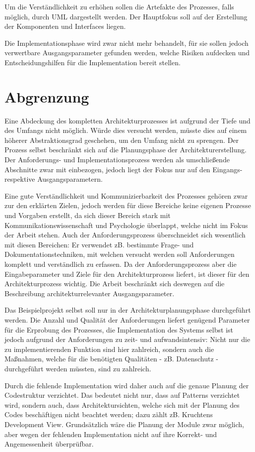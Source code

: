 Um die Verständlichkeit zu erhöhen sollen die Artefakte des Prozesses, falls möglich, durch UML dargestellt werden. Der Hauptfokus soll auf der Erstellung der Komponenten und Interfaces liegen.

Die Implementationsphase wird zwar nicht mehr behandelt, für sie sollen jedoch verwertbare Ausgangsparameter gefunden werden, welche Risiken aufdecken und Entscheidungshilfen für die Implementation bereit stellen.


\section{Abgrenzung}
Eine Abdeckung des kompletten Architekturprozesses ist aufgrund der Tiefe und des Umfangs nicht möglich. Würde dies versucht werden, müsste dies auf einem  höherer Abstraktionsgrad geschehen, um den Umfang nicht zu sprengen. Der Prozess selbst beschränkt sich auf die Planungsphase der Architekturerstellung. Der Anforderungs- und Implementationsprozess werden als umschließende Abschnitte zwar mit einbezogen, jedoch liegt der Fokus nur auf den Eingangs- respektive Ausgangsparametern.

Eine gute Verständlichkeit und Kommunizierbarkeit des Prozesses gehören zwar zur den erklärten Zielen, jedoch werden für diese Bereiche keine eigenen Prozesse und Vorgaben erstellt, da sich dieser Bereich stark mit Kommunikationswissenschaft und Psychologie überlappt, welche nicht im Fokus der Arbeit stehen. Auch der Anforderungsprozess überschneidet sich wesentlich mit diesen Bereichen: Er verwendet zB. bestimmte Frage- und Dokumentationstechniken, mit welchen versucht werden soll Anforderungen komplett und verständlich zu erfassen. Da der Anforderungsprozess aber die Eingabeparameter und Ziele für den Architekturprozess liefert, ist dieser für den Architekturprozess wichtig. Die Arbeit beschränkt sich deswegen auf die Beschreibung architekturrelevanter Ausgangsparameter.

Das Beispielprojekt selbst soll nur in der Architekturplanungsphase durchgeführt werden. Die Anzahl und Qualität der Anforderungen liefert genügend Parameter für die Erprobung des Prozesses, die Implementation des Systems selbst ist jedoch aufgrund der Anforderungen zu zeit- und aufwandsintensiv: Nicht nur die zu implementierenden Funktion sind hier zahlreich, sondern auch die Maßnahmen, welche für die benötigten Qualitäten - zB. Datenschutz - durchgeführt werden müssten, sind zu zahlreich.

Durch die fehlende Implementation wird daher auch auf die genaue Planung der Codestruktur verzichtet. Das bedeutet nicht nur, dass auf Patterns verzichtet wird, sondern auch, dass Architektursichten, welche sich mit der Planung des Codes beschäftigen nicht beachtet werden; dazu zählt zB. Kruchtens Development View. Grundsätzlich wäre die Planung der Module zwar möglich, aber wegen der fehlenden Implementation nicht auf ihre Korrekt- und Angemessenheit überprüfbar.

